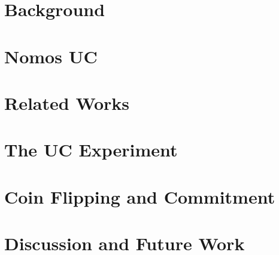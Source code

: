 \documentclass[format=acmsmall, screen=true, review=false]{acmart}
\begin{document}
\section{Background} \label{sec:background}


\section{Nomos UC} \label{sec:nomosuc}


\section{Related Works}


%

\section{The UC Experiment} \label{sec:execuc}


\section{Coin Flipping and Commitment} \label{sec:commitment}


%

%
%
%

\section{Discussion and Future Work}

\end{document}
